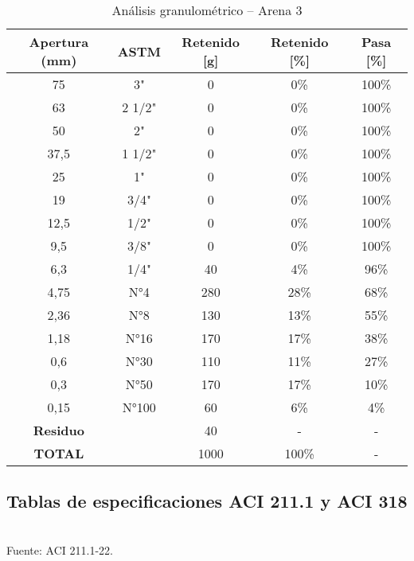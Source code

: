 \begin{table}[H]
\centering
\caption{Análisis granulométrico – Arena 3}
\label{tab:arena3}
\small
\begin{tabular}{|c|c|c|c|c|}
\hline
\textbf{Apertura (mm)} & \textbf{ASTM} & \textbf{Retenido [g]} & \textbf{Retenido [\%]} & \textbf{Pasa [\%]} \\ \hline
75   & 3"      & 0   & 0\%  & 100\% \\ \hline
63   & 2 1/2"  & 0   & 0\%  & 100\% \\ \hline
50   & 2"      & 0   & 0\%  & 100\% \\ \hline
37,5 & 1 1/2"  & 0   & 0\%  & 100\% \\ \hline
25   & 1"      & 0   & 0\%  & 100\% \\ \hline
19   & 3/4"    & 0   & 0\%  & 100\% \\ \hline
12,5 & 1/2"    & 0   & 0\%  & 100\% \\ \hline
9,5  & 3/8"    & 0   & 0\%  & 100\% \\ \hline
6,3  & 1/4"    & 40  & 4\%  & 96\%  \\ \hline
4,75 & N°4     & 280 & 28\% & 68\%  \\ \hline
2,36 & N°8     & 130 & 13\% & 55\%  \\ \hline
1,18 & N°16    & 170 & 17\% & 38\%  \\ \hline
0,6  & N°30    & 110 & 11\% & 27\%  \\ \hline
0,3  & N°50    & 170 & 17\% & 10\%  \\ \hline
0,15 & N°100   & 60  & 6\%  & 4\%   \\ \hline
\textbf{Residuo} &     & 40  & -    & -     \\ \hline
\textbf{TOTAL}  &     & 1000& 100\%& -     \\ \hline
\end{tabular}
\end{table}

\subsection{Tablas de especificaciones ACI 211.1 y ACI 318}

\begin{table}[H]
\centering
\caption{Rangos típicos de asentamiento sin aditivos reductores de agua.}
\label{tab:rangos-asentamiento}
\setlength{\tabcolsep}{6pt}
\renewcommand{\arraystretch}{1.15}
\small
{}
\\Fuente: ACI 211.1-22.
\end{table}

